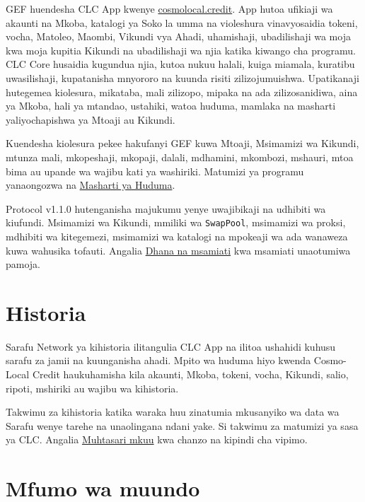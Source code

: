 \documentclass[11pt]{article}
\begin{document}
GEF huendesha CLC App kwenye \href{https://cosmolocal.credit}{cosmolocal.credit}. App hutoa ufikiaji wa akaunti na Mkoba, katalogi ya Soko la umma na violeshura vinavyosaidia tokeni, vocha, Matoleo, Maombi, Vikundi vya Ahadi, uhamishaji, ubadilishaji wa moja kwa moja kupitia Kikundi na ubadilishaji wa njia katika kiwango cha programu. CLC Core husaidia kugundua njia, kutoa nukuu halali, kuiga miamala, kuratibu uwasilishaji, kupatanisha mnyororo na kuunda risiti zilizojumuishwa. Upatikanaji hutegemea kiolesura, mikataba, mali zilizopo, mipaka na ada zilizosanidiwa, aina ya Mkoba, hali ya mtandao, ustahiki, watoa huduma, mamlaka na masharti yaliyochapishwa ya Mtoaji au Kikundi.

Kuendesha kiolesura pekee hakufanyi GEF kuwa Mtoaji, Msimamizi wa Kikundi, mtunza mali, mkopeshaji, mkopaji, dalali, mdhamini, mkombozi, mshauri, mtoa bima au upande wa wajibu kati ya washiriki. Matumizi ya programu yanaongozwa na \href{https://docs.cosmolocal.credit/sw/governance/terms}{Masharti ya Huduma}.

Protocol v1.1.0 hutenganisha majukumu yenye uwajibikaji na udhibiti wa kiufundi. Msimamizi wa Kikundi, mmiliki wa \texttt{SwapPool}, msimamizi wa proksi, mdhibiti wa kitegemezi, msimamizi wa katalogi na mpokeaji wa ada wanaweza kuwa wahusika tofauti. Angalia \href{https://docs.cosmolocal.credit/sw/introduction/concepts}{Dhana na msamiati} kwa msamiati unaotumiwa pamoja.

\section*{Historia}

Sarafu Network ya kihistoria ilitangulia CLC App na ilitoa ushahidi kuhusu sarafu za jamii na kuunganisha ahadi. Mpito wa huduma hiyo kwenda Cosmo-Local Credit haukuhamisha kila akaunti, Mkoba, tokeni, vocha, Kikundi, salio, ripoti, mshiriki au wajibu wa kihistoria.

Takwimu za kihistoria katika waraka huu zinatumia mkusanyiko wa data wa Sarafu wenye tarehe na unaolingana ndani yake. Si takwimu za matumizi ya sasa ya CLC. Angalia \href{https://docs.cosmolocal.credit/sw/white-paper/executive-summary}{Muhtasari mkuu} kwa chanzo na kipindi cha vipimo.

\section*{Mfumo wa muundo}
\end{document}
